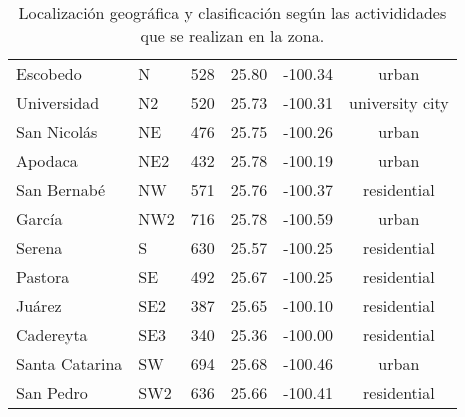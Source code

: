 \begin{table}[H]
\begin{tabular}{llcccc}
        Escobedo       & N    & 528               & 25.80    & -100.34   & urban           \\
        Universidad    & N2   & 520               & 25.73    & -100.31   & university city \\
        San Nicolás    & NE   & 476               & 25.75    & -100.26   & urban           \\
        Apodaca        & NE2  & 432               & 25.78    & -100.19   & urban           \\
        San Bernabé    & NW   & 571               & 25.76    & -100.37   & residential     \\
        García         & NW2  & 716               & 25.78    & -100.59   & urban           \\
        Serena         & S    & 630               & 25.57    & -100.25   & residential     \\
        Pastora        & SE   & 492               & 25.67    & -100.25   & residential     \\
        Juárez         & SE2  & 387               & 25.65    & -100.10   & residential     \\
        Cadereyta      & SE3  & 340               & 25.36    & -100.00   & residential     \\
        Santa Catarina & SW   & 694               & 25.68    & -100.46   & urban           \\
        San Pedro      & SW2  & 636               & 25.66    & -100.41   & residential     \\ \hline
    \end{tabular}
    \caption{Localización geográfica y clasificación según las activididades que se realizan en la zona.}
    \label{table:stations_loc}
\end{table}